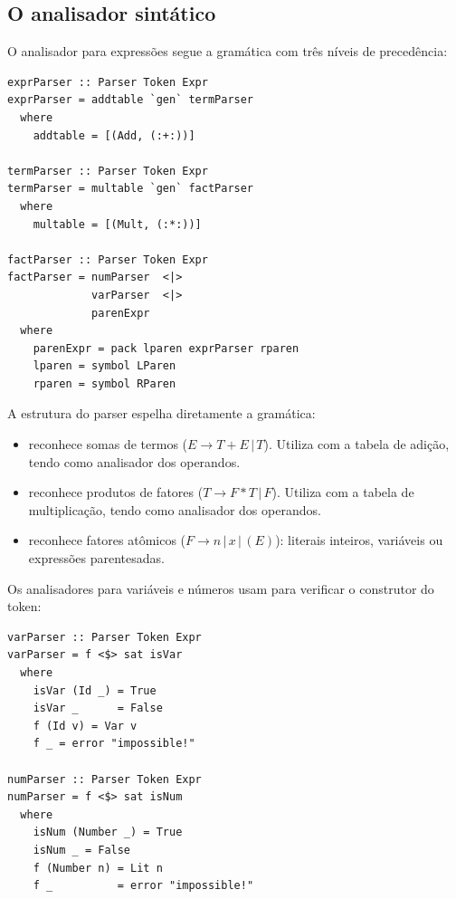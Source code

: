 \subsection{O analisador sintático}

O analisador para expressões segue a gramática com três níveis de precedência:

\begin{verbatim}
exprParser :: Parser Token Expr
exprParser = addtable `gen` termParser
  where
    addtable = [(Add, (:+:))]

termParser :: Parser Token Expr
termParser = multable `gen` factParser
  where
    multable = [(Mult, (:*:))]

factParser :: Parser Token Expr
factParser = numParser  <|>
             varParser  <|>
             parenExpr
  where
    parenExpr = pack lparen exprParser rparen
    lparen = symbol LParen
    rparen = symbol RParen
\end{verbatim}

A estrutura do parser espelha diretamente a gramática:

\begin{itemize}
  \item {} reconhece somas de termos
    ($E \to T + E \,|\, T$). Utiliza  com a
    tabela de adição, tendo  como
    analisador dos operandos.
  \item {} reconhece produtos de
    fatores ($T \to F * T \,|\, F$). Utiliza
     com a tabela de multiplicação,
    tendo  como analisador dos operandos.
  \item {} reconhece fatores atômicos
    ($F \to n \,|\, x \,|\, (E)$): literais inteiros,
    variáveis ou expressões parentesadas.
\end{itemize}

Os analisadores para variáveis e números usam
 para verificar o construtor do token:

\begin{verbatim}
varParser :: Parser Token Expr
varParser = f <$> sat isVar
  where
    isVar (Id _) = True
    isVar _      = False
    f (Id v) = Var v
    f _ = error "impossible!"

numParser :: Parser Token Expr
numParser = f <$> sat isNum
  where
    isNum (Number _) = True
    isNum _ = False
    f (Number n) = Lit n
    f _          = error "impossible!"
\end{verbatim}

